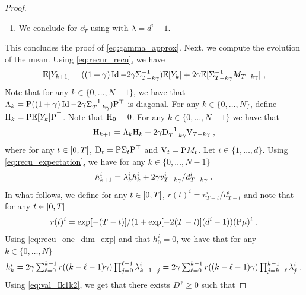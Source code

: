 \begin{proof}
\begin{enumerate}[wide, labelwidth=!, labelindent=0pt, label=(\roman*)]
\begin{align}
    &= d + d^2 (d-1) \exp[-4T]/(1 + \exp[-2T](d-1))^2 \eqsp . 
  \end{align}
\item We conclude for $e_T^i$ using  with
  $\lambda = d^i - 1$.
\end{enumerate}
This concludes the proof of \eqref{eq:gamma_approx}. Next, we compute the
evolution of the mean. Using \eqref{eq:recur_recu}, we have 
\begin{equation}
  \label{eq:recur_recu}
  \mathbb{E} [ Y_{k+1} ] = ((1 + \gamma) \operatorname{Id} - 2\gamma \Sigma_{T - k \gamma}^{-1}) \mathbb{E} [ Y_k ]  + 2 \gamma \mathbb{E} [ \Sigma_{T - k \gamma}^{-1} M_{T-k \gamma} ] \; ,
\end{equation}
Note that for any $k \in \{0, \dots, N-1\}$, we have that
$\Lambda_k = \mathrm{P} ((1+ \gamma) \operatorname{Id} - 2 \gamma \Sigma_{T-k\gamma}^{-1})
\mathrm{P}^\top$ is diagonal. For any $k \in \{0, \dots, N\}$, define
$\mathrm{H}_k = \mathrm{P} \mathbb{E} [ Y_{k} ] \mathrm{P}^\top$. Note that
$\mathrm{H}_0 = 0$. For any $k \in \{0, \dots, N-1\}$ we have that
\begin{equation}
  \label{eq:recu_expectation}
  \mathrm{H}_{k+1} = \Lambda_k \mathrm{H}_k + 2 \gamma \mathrm{D}_{T- k\gamma}^{-1} \mathrm{V}_{T- k \gamma} \; ,
\end{equation}
where for any $t \in \left[0,T\right]$, $\mathrm{D}_t = \mathrm{P} \Sigma_t \mathrm{P}^\top$ and
$\mathrm{V}_t = \mathrm{P} M_{t}$. Let $i \in \{1, \dots, d\}$. Using
\eqref{eq:recu_expectation}, we have for any $k \in \{0, \dots, N-1\}$
\begin{equation}
  \label{eq:recu_one_dim_exp}
  h_{k+1}^i = \lambda_k^i h_k^i + 2 \gamma v_{T-k \gamma}^i / d_{T-k\gamma}^i \; . 
\end{equation}
In what follows, we define for any $t \in \left[0,T\right]$, $r(t)^i = v_{T-t}^i / d_{T-t}^i$
and note that for any $t \in \left[0,T\right]$
\begin{equation}
  \label{eq:r_express}
  r(t)^i = \exp[-(T-t)] / (1 + \exp[-2(T-t)](d^i - 1)) (\mathrm{P} \mu)^i \; . 
\end{equation}
Using \eqref{eq:recu_one_dim_exp} and that $h_0^i = 0$, we have that for any $k \in \{0, \dots, N\}$
\begin{equation}
  \label{eq:unroll_recursion_exp}
  \textstyle{
    h_k^i =  2\gamma \sum_{\ell=0}^{k-1} r((k - \ell - 1)\gamma) \prod_{j=0}^{\ell-1} \lambda_{k-1-j}^i  =  2\gamma \sum_{\ell=0}^{k-1} r((k - \ell - 1)\gamma) \prod_{j=k-\ell}^{k-1} \lambda_{j}^i \;. 
  }
\end{equation}
Using \eqref{eq:val_Ik1k2}, we get that there exists $D^\gamma \geq 0$ such that

\end{proof}
